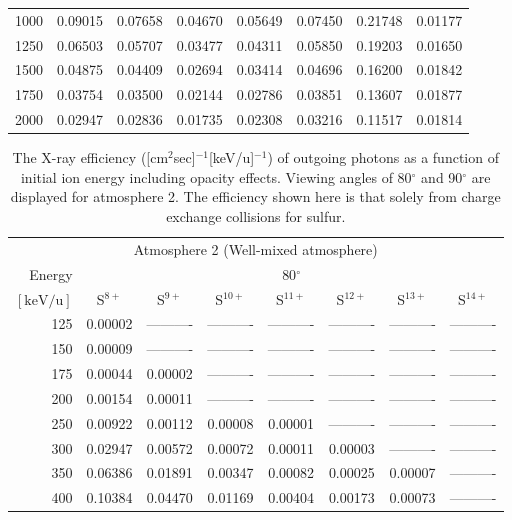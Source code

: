 \begin{table}[ht]
\begin{tabular}{r|c|c|c|c|c|c|c}
     1000 & 0.09015 & 0.07658 & 0.04670 & 0.05649 & 0.07450 & 0.21748 & 0.01177 \\
     1250 & 0.06503 & 0.05707 & 0.03477 & 0.04311 & 0.05850 & 0.19203 & 0.01650 \\
     1500 & 0.04875 & 0.04409 & 0.02694 & 0.03414 & 0.04696 & 0.16200 & 0.01842 \\
     1750 & 0.03754 & 0.03500 & 0.02144 & 0.02786 & 0.03851 & 0.13607 & 0.01877 \\
     2000 & 0.02947 & 0.02836 & 0.01735 & 0.02308 & 0.03216 & 0.11517 & 0.01814 \\ \cline{1-8}
    \end{tabular}
    \label{tab:XRayEffOCX3}
\end{table}

\begin{table}[ht]
    \centering
    \caption{The X-ray efficiency ([cm$^2$sec]$^{-1}$[keV/u]$^{-1}$) of outgoing photons as a function of initial ion energy including opacity effects. Viewing angles of 80$^\circ$ and 90$^\circ$ are displayed for atmosphere 2. The efficiency shown here is that solely from charge exchange collisions for sulfur.}
    \begin{tabular}{r|c|c|c|c|c|c|c}
    \multicolumn{8}{c}{Atmosphere 2 (Well-mixed atmosphere)} \\ \cline{2-8}
    Energy & \multicolumn{7}{c}{80$^\circ$} \\ \cline{2-8}
    $\mathrm{[keV/u]}$ & S$^{8+}$ & S$^{9+}$ & S$^{10+}$ & S$^{11+}$ & S$^{12+}$ & S$^{13+}$ & S$^{14+}$ \\ \cline{1-8}
      125 & 0.00002 & ---------- & ---------- & ---------- & ---------- & ---------- & ---------- \\
      150 & 0.00009 & ---------- & ---------- & ---------- & ---------- & ---------- & ---------- \\
      175 & 0.00044 & 0.00002 & ---------- & ---------- & ---------- & ---------- & ---------- \\
      200 & 0.00154 & 0.00011 & ---------- & ---------- & ---------- & ---------- & ---------- \\
      250 & 0.00922 & 0.00112 & 0.00008 & 0.00001 & ---------- & ---------- & ---------- \\
      300 & 0.02947 & 0.00572 & 0.00072 & 0.00011 & 0.00003 & ---------- & ---------- \\
      350 & 0.06386 & 0.01891 & 0.00347 & 0.00082 & 0.00025 & 0.00007 & ---------- \\
      400 & 0.10384 & 0.04470 & 0.01169 & 0.00404 & 0.00173 & 0.00073 & ---------- \\

\end{tabular}
\end{table}
